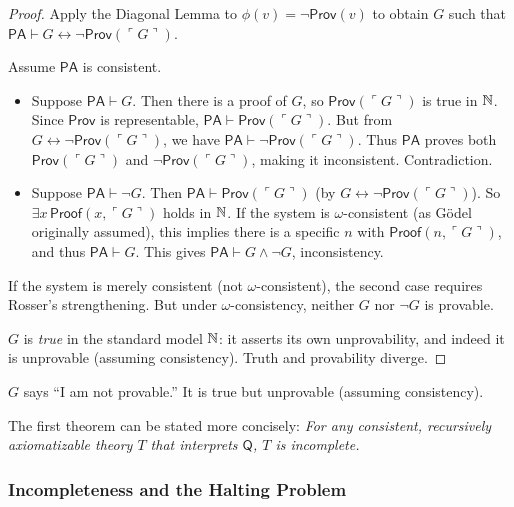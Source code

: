 \begin{proof}
Apply the Diagonal Lemma to $\phi(v) = \neg \mathsf{Prov}(v)$ to obtain $G$ such that $\mathsf{PA} \vdash G \leftrightarrow \neg \mathsf{Prov}(\ulcorner G \urcorner)$.

Assume $\mathsf{PA}$ is consistent.

\begin{itemize}
\item Suppose $\mathsf{PA} \vdash G$. Then there is a proof of $G$, so $\mathsf{Prov}(\ulcorner G \urcorner)$ is true in $\mathbb{N}$. Since $\mathsf{Prov}$ is representable, $\mathsf{PA} \vdash \mathsf{Prov}(\ulcorner G \urcorner)$. But from $G \leftrightarrow \neg \mathsf{Prov}(\ulcorner G \urcorner)$, we have $\mathsf{PA} \vdash \neg \mathsf{Prov}(\ulcorner G \urcorner)$. Thus $\mathsf{PA}$ proves both $\mathsf{Prov}(\ulcorner G \urcorner)$ and $\neg \mathsf{Prov}(\ulcorner G \urcorner)$, making it inconsistent. Contradiction.

\item Suppose $\mathsf{PA} \vdash \neg G$. Then $\mathsf{PA} \vdash \mathsf{Prov}(\ulcorner G \urcorner)$ (by $G \leftrightarrow \neg \mathsf{Prov}(\ulcorner G \urcorner)$). So $\exists x\, \mathsf{Proof}(x, \ulcorner G \urcorner)$ holds in $\mathbb{N}$. If the system is $\omega$-consistent (as Gödel originally assumed), this implies there is a specific $n$ with $\mathsf{Proof}(n, \ulcorner G \urcorner)$, and thus $\mathsf{PA} \vdash G$. This gives $\mathsf{PA} \vdash G \land \neg G$, inconsistency.
\end{itemize}

If the system is merely consistent (not $\omega$-consistent), the second case requires Rosser's strengthening. But under $\omega$-consistency, neither $G$ nor $\neg G$ is provable.

$G$ is \emph{true} in the standard model $\mathbb{N}$: it asserts its own unprovability, and indeed it is unprovable (assuming consistency). Truth and provability diverge.
\end{proof}

\begin{definition}
$G$ says ``I am not provable.'' It is true but unprovable (assuming consistency).
\end{definition}

The first theorem can be stated more concisely: \emph{For any consistent, recursively axiomatizable theory $T$ that interprets $\mathsf{Q}$, $T$ is incomplete.}

\subsubsection*{Incompleteness and the Halting Problem}

